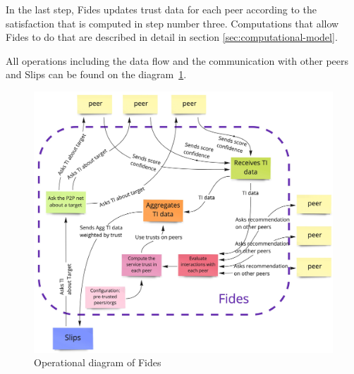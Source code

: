In the last step, Fides updates trust data for each peer according to the satisfaction that is computed in step number three.
Computations that allow Fides to do that are described in detail in section \ref{sec:computational-model}.

All operations including the data flow and the communication with other peers and Slips can be found on the diagram~\ref{fig:trust-model-operational-diagram}.

\begin{figure}[h]
    \centering
    \includegraphics[width=1.0\textwidth]{assets/fides_operational_diagram.jpeg}
    \caption{Operational diagram of Fides}
    \label{fig:trust-model-operational-diagram}
\end{figure}